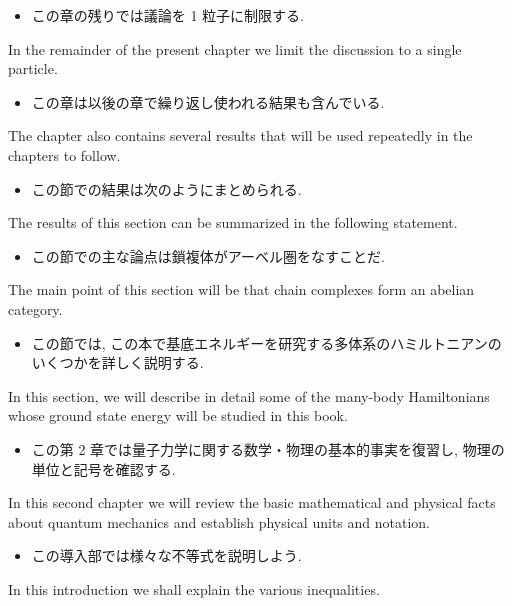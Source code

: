 \documentclass[openany, a4paper, oneside]{jsbook}
\begin{document}
\begin{itemize}
\item この章の残りでは議論を 1 粒子に制限する. \cite{LiebSeiringer1}
\end{itemize}
In the remainder of the present chapter we limit the discussion to a single particle.

\begin{itemize}
\item この章は以後の章で繰り返し使われる結果も含んでいる. \cite{LiebSeiringer1}
\end{itemize}
The chapter also contains several results that will be used repeatedly in the chapters to follow.

\begin{itemize}
\item この節での結果は次のようにまとめられる. \cite{LiebSeiringer1}
\end{itemize}
The results of this section can be summarized in the following statement.

\begin{itemize}
\item この節での主な論点は鎖複体がアーベル圏をなすことだ. \cite{CharlesWeibel1}
\end{itemize}
The main point of this section will be that chain complexes form an abelian category.

\begin{itemize}
\item この節では, この本で基底エネルギーを研究する多体系のハミルトニアンのいくつかを詳しく説明する.
\end{itemize}
In this section, we will describe in detail some of the many-body Hamiltonians whose
ground state energy will be studied in this book.

\begin{itemize}
\item この第 2 章では量子力学に関する数学・物理の基本的事実を復習し, 物理の単位と記号を確認する.  \cite{LiebSeiringer1}
\end{itemize}
In this second chapter we will review the basic mathematical and physical facts
about quantum mechanics and establish physical units and notation.

\begin{itemize}
\item この導入部では様々な不等式を説明しよう. \cite{LiebSeiringer1}
\end{itemize}
In this introduction we shall explain the various inequalities.
\end{document}
